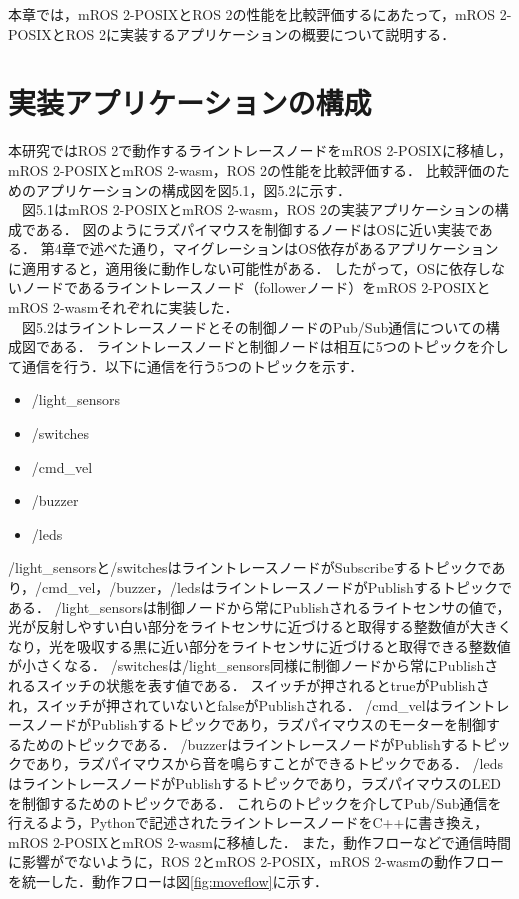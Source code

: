 本章では，mROS 2-POSIXとROS 2の性能を比較評価するにあたって，mROS 2-POSIXとROS 2に実装するアプリケーションの概要について説明する．
\section{実装アプリケーションの構成}
本研究ではROS 2で動作するライントレースノードをmROS 2-POSIXに移植し，mROS 2-POSIXとmROS 2-wasm，ROS 2の性能を比較評価する．
比較評価のためのアプリケーションの構成図を図5.1，図5.2に示す．
\\　図5.1はmROS 2-POSIXとmROS 2-wasm，ROS 2の実装アプリケーションの構成である．
図のようにラズパイマウスを制御するノードはOSに近い実装である．
第4章で述べた通り，マイグレーションはOS依存があるアプリケーションに適用すると，適用後に動作しない可能性がある．
したがって，OSに依存しないノードであるライントレースノード（followerノード）をmROS 2-POSIXとmROS 2-wasmそれぞれに実装した．
\\　図5.2はライントレースノードとその制御ノードのPub/Sub通信についての構成図である．
ライントレースノードと制御ノードは相互に5つのトピックを介して通信を行う．以下に通信を行う5つのトピックを示す．
\begin{itemize}
    \item /light\_sensors
    \item /switches
    \item /cmd\_vel
    \item /buzzer
    \item /leds
\end{itemize}
/light\_sensorsと/switchesはライントレースノードがSubscribeするトピックであり，/cmd\_vel，/buzzer，/ledsはライントレースノードがPublishするトピックである．
/light\_sensorsは制御ノードから常にPublishされるライトセンサの値で，光が反射しやすい白い部分をライトセンサに近づけると取得する整数値が大きくなり，光を吸収する黒に近い部分をライトセンサに近づけると取得できる整数値が小さくなる．
/switchesは/light\_sensors同様に制御ノードから常にPublishされるスイッチの状態を表す値である．
スイッチが押されるとtrueがPublishされ，スイッチが押されていないとfalseがPublishされる．
/cmd\_velはライントレースノードがPublishするトピックであり，ラズパイマウスのモーターを制御するためのトピックである．
/buzzerはライントレースノードがPublishするトピックであり，ラズパイマウスから音を鳴らすことができるトピックである．
/ledsはライントレースノードがPublishするトピックであり，ラズパイマウスのLEDを制御するためのトピックである．
これらのトピックを介してPub/Sub通信を行えるよう，Pythonで記述されたライントレースノードをC++に書き換え，mROS 2-POSIXとmROS 2-wasmに移植した．
また，動作フローなどで通信時間に影響がでないように，ROS 2とmROS 2-POSIX，mROS 2-wasmの動作フローを統一した．動作フローは図\ref{fig:moveflow}に示す．

